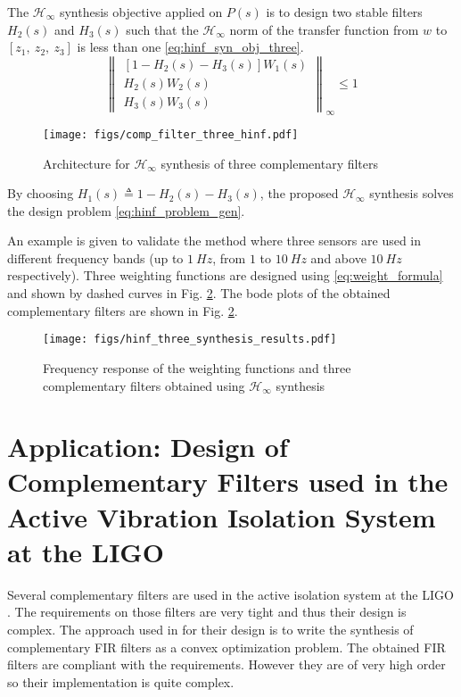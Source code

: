 \documentclass[conference]{IEEEtran}
\begin{document}
The \(\mathcal{H}_\infty\) synthesis objective applied on \(P(s)\) is to design two stable filters \(H_2(s)\) and \(H_3(s)\) such that the \(\mathcal{H}_\infty\) norm of the transfer function from \(w\) to \([z_1,\ z_2, \ z_3]\) is less than one \eqref{eq:hinf_syn_obj_three}.
\begin{equation}
\label{eq:hinf_syn_obj_three}
  \left\| \begin{matrix} \left[1 - H_2(s) - H_3(s)\right] W_1(s) \\ H_2(s) W_2(s) \\ H_3(s) W_3(s) \end{matrix} \right\|_\infty \le 1
\end{equation}

\begin{figure}[htbp]
\centering
\texttt{[image: figs/comp\_filter\_three\_hinf.pdf]}
\caption{\label{fig:comp_filter_three_hinf}
Architecture for \(\mathcal{H}_\infty\) synthesis of three complementary filters}
\end{figure}

By choosing \(H_1(s) \triangleq 1 - H_2(s) - H_3(s)\), the proposed \(\mathcal{H}_\infty\) synthesis solves the design problem \eqref{eq:hinf_problem_gen}. \par
An example is given to validate the method where three sensors are used in different frequency bands (up to \(\SI{1}{Hz}\), from \(1\) to \(\SI{10}{Hz}\) and above \(\SI{10}{Hz}\) respectively).
Three weighting functions are designed using \eqref{eq:weight_formula} and shown by dashed curves in Fig. \ref{fig:hinf_three_synthesis_results}.
The bode plots of the obtained complementary filters are shown in Fig. \ref{fig:hinf_three_synthesis_results}.

\begin{figure}[htbp]
\centering
\texttt{[image: figs/hinf\_three\_synthesis\_results.pdf]}
\caption{\label{fig:hinf_three_synthesis_results}
Frequency response of the weighting functions and three complementary filters obtained using \(\mathcal{H}_\infty\) synthesis}
\end{figure}

\section{Application: Design of Complementary Filters used in the Active Vibration Isolation System at the LIGO}
\label{sec:orgc2ed648}
\label{sec:application_ligo}
Several complementary filters are used in the active isolation system at the LIGO \cite{hua05_low_ligo,hua04_polyp_fir_compl_filter_contr_system}.
The requirements on those filters are very tight and thus their design is complex.
The approach used in \cite{hua05_low_ligo} for their design is to write the synthesis of complementary FIR filters as a convex optimization problem.
The obtained FIR filters are compliant with the requirements. However they are of very high order so their implementation is quite complex.
\end{document}
